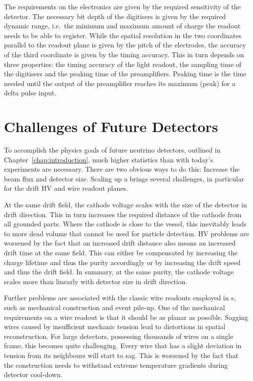 The requirements on the electronics are given by the required sensitivity of the detector.
The necessary bit depth of the digitisers is given by the required dynamic range, i.e.\ the minimum and maximum amount of charge the readout needs to be able to register.
While the spatial resolution in the two coordinates parallel to the readout plane is given by the pitch of the electrodes, the accuracy of the third coordinate is given by the timing accuracy.
This in turn depends on three properties: the timing accuracy of the light readout, the sampling time of the digitisers and the peaking time of the preamplifiers.
Peaking time is the time needed until the output of the preamplifier reaches its maximum (peak) for a delta pulse input.


\section{Challenges of Future Detectors}
\label{sec:lartpc_challenges}

To accomplish the physics goals of future neutrino detectors, outlined in Chapter~\ref{chap:introduction}, much higher statistics than with today's experiments are necessary.
There are two obvious ways to do this: Increase the beam flux and detector size.
Scaling up a \lartpc{} brings several challenges, in particular for the drift HV and wire readout planes.

At the same drift field, the cathode voltage scales with the size of the detector in drift direction.
This in turn increases the required distance of the cathode from all grounded parts.
Where the cathode is close to the \lar{} vessel, this inevitably leads to more dead volume that cannot be used for particle detection.
HV problems are worsened by the fact that an increased drift distance also means an increased drift time at the same field.
This can either be compensated by increasing the charge lifetime and thus the \lar{} purity accordingly or by increasing the drift speed and thus the drift field.
In summary, at the same \lar{} purity, the cathode voltage scales more than linearly with detector size in drift direction.

Further problems are associated with the classic wire readouts employed in \lartpc{}s, such as mechanical construction and event pile-up.
One of the mechanical requirements on a wire readout is that it should be as planar as possible.
Sagging wires caused by insufficient mechanic tension lead to distortions in spatial reconstruction.
For large detectors, possessing thousands of wires on a single frame, this becomes quite challenging.
Every wire that has a slight deviation in tension from its neighbours will start to sag.
This is worsened by the fact that the construction needs to withstand extreme temperature gradients during detector cool-down.

